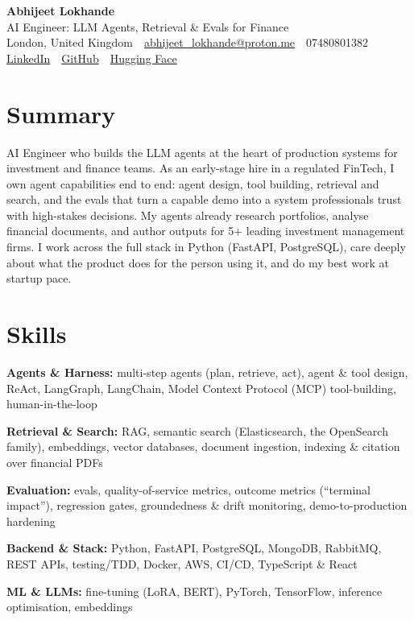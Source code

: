 \documentclass[10pt,a4paper]{article}
\newcommand{\sep}{\,\textcolor{accent!60}{\textbar}\,}
\begin{document}
\begin{center}
  {\fontsize{24}{26}\selectfont\bfseries Abhijeet Lokhande}\\[3pt]
  {\color{accent}\large AI Engineer: LLM Agents, Retrieval \& Evals for Finance}\\[5pt]
  {\small
    London, United Kingdom \sep
    \href{mailto:abhijeet_lokhande@proton.me}{abhijeet\_lokhande@proton.me} \sep
    07480801382 \\[2pt]
    \href{https://www.linkedin.com/in/ablds/}{LinkedIn} \sep
    \href{https://github.com/abhijeetscode}{GitHub} \sep
    \href{https://huggingface.co/ab-ai}{Hugging Face}
  }
\end{center}
\vspace{2pt}

\section{Summary}
AI Engineer who builds the LLM agents at the heart of production systems for investment and finance teams. As an early-stage hire in a regulated FinTech, I own agent capabilities end to end: agent design, tool building, retrieval and search, and the evals that turn a capable demo into a system professionals trust with high-stakes decisions. My agents already research portfolios, analyse financial documents, and author outputs for 5+ leading investment management firms. I work across the full stack in Python (FastAPI, PostgreSQL), care deeply about what the product does for the person using it, and do my best work at startup pace.

\section{Skills}
\begin{tight}
  \item[\textcolor{accent}{\small$\bullet$}] \textbf{Agents \& Harness:} multi-step agents (plan, retrieve, act), agent \& tool design, ReAct, LangGraph, LangChain, Model Context Protocol (MCP) tool-building, human-in-the-loop
  \item[\textcolor{accent}{\small$\bullet$}] \textbf{Retrieval \& Search:} RAG, semantic search (Elasticsearch, the OpenSearch family), embeddings, vector databases, document ingestion, indexing \& citation over financial PDFs
  \item[\textcolor{accent}{\small$\bullet$}] \textbf{Evaluation:} evals, quality-of-service metrics, outcome metrics (``terminal impact''), regression gates, groundedness \& drift monitoring, demo-to-production hardening
  \item[\textcolor{accent}{\small$\bullet$}] \textbf{Backend \& Stack:} Python, FastAPI, PostgreSQL, MongoDB, RabbitMQ, REST APIs, testing/TDD, Docker, AWS, CI/CD, TypeScript \& React
  \item[\textcolor{accent}{\small$\bullet$}] \textbf{ML \& LLMs:} fine-tuning (LoRA, BERT), PyTorch, TensorFlow, inference optimisation, embeddings
\end{tight}
\end{document}
